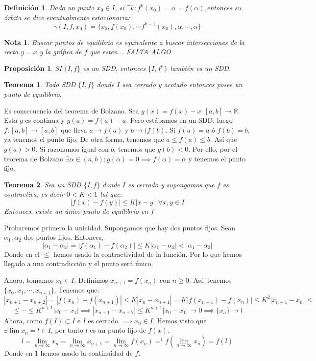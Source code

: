 \documentclass[11pt, a4paper, titlepage]{article}
\makeatletter
\renewenvironment{proof}[1][\proofname] {\vspace{-15pt}\par\pushQED{\qed}\normalfont\topsep6\p@\@plus6\p@\relax\trivlist\item[\hskip\labelsep\it#1\@addpunct{.}]\ignorespaces}{\popQED\endtrivlist\@endpefalse}
\newcommand{\R}{\mathbb{R}}
\theoremstyle{theorem-style}
\newtheorem*{nth}{Teorema}
\newtheorem*{nprop}{Proposición}
\theoremstyle{definition-style}
\newtheorem*{ndef}{Definición}
\theoremstyle{remark-style}
\newtheorem*{nota}{Nota}
\theoremstyle{example-style}
\makeatother
\begin{document}
\begin{ndef}
	Dado un punto $x_0 \in I$, si $\exists k: f^k(x_0) = \alpha = f(\alpha)$,entonces su órbita se dice eventualmente estacionaria:
	\[
	\gamma(I,f,x_0) = \{x_0, f(x_0), \cdots f^{k-1}(x_0), \alpha, \cdots, \alpha\}
	\]
\end{ndef}
\begin{nota}
	Buscar puntos de equilibrio es equivalente a buscar intersecciones de la recta $y=x$ y la gráfica de $f$ que esten... FALTA ALGO
	
	
\end{nota}
\begin{nprop}
	SI $\{I,f\}$ es un SDD, entonces $\{I,f^n\}$ también es un SDD.
\end{nprop}

\begin{nth}
	Todo SDD $\{I,f\}$ donde $I$ sea cerrado y acotado entonces posee un punto de equilibrio.
\end{nth}
\begin{proof}
	Es consecuencia del teorema de Bolzano. Sea $g(x) = f(x)-x :[a,b] \to \R$. Esta $g$ es continua y $g(a) = f(a)-a$. Pero estábamos en un SDD, luego $f:[a,b] \to [a,b]$ que lleva $a \to f(a) $ y $b \to(f(b)$. Si $f(a) = a $ ó $f(b) = b$, ya tenemos el punto fijo. De otra forma, tenemos que  $a \leq f(a) \leq b$.
	Así que $g(a) > 0$. Si razonamos igual con $b$, tenemos que $g(b) < 0$. 
	Por ello, por el teorema de Bolzano $\exists \alpha \in (a,b) : g(\alpha) = 0 \implies f(\alpha) = \alpha $ y tenemos el punto fijo.
	

\end{proof}
\begin{nth}
	Sea un SDD $\{I,f\}$ donde $I$ es cerrado y supongamos que $f$ es contractiva, es decir $0 < K < 1$ tal que:
	\[
	|f(x)-f(y)| \leq K |x-y| \ \ \forall x,y \in I
	\]
Entonces, existe un único punto de equilibrio en $f$
\end{nth}

\begin{proof}
	Probaremos primero la unicidad. Supongamos que hay dos puntos fijos. Sean $\alpha_1, \alpha_2$ dos puntos fijos. Entonces,
	 \[
	|\alpha_1 - \alpha_2| = |f(\alpha_1)- f(\alpha_2)| \leq K |\alpha_1 - \alpha_2| < |\alpha_1 - \alpha_2|
	\]
	Donde en el $\leq$ hemos usado la contractividad de la función. Por lo que hemos llegado a una contradicción y el punto será único.
	
	Ahora, tomamos $x_0\in I$. Definimos $x _{n+1} = f(x_n) $ con $n\geq 0$. Así, tenemos $\{x_0,x_1,\cdots , x _{n+1}\}$. Tenemos que:
	\[
	|x _{n+1} - x _{n+2}| = |f(x_n) - f(x _{n+1})| \leq K |x_n - x _{n+1}|= K |f(x _{n-1})- f(x_n)| \leq K^2|x _{n-1}-x_n| \leq 
	\]
	\[
	\leq \cdots \leq K^{n+1}|x_0 - x_1| \implies |x _{n+1}- x _{n+2}| \leq K^{n+1}|x_0-x_1| \to 0 \implies \{x_n\} \to l 
	\]
	Ahora, como $f(I)\subset I$ e $I$ es cerrado $\implies x_n \in I $. 
	Hemos visto que $\exists \lim x_n = l \in I$, por tanto $l$ es un punto fijo de $f(x)$.
	\[
	l =  \lim_{n\to \infty}x_n = \lim_{n\to \infty}x_{n+1} = \lim_{n\to \infty}f(x_n) =^1 f(\lim_{n\to \infty}x_n) = f(l)  
	\]
	Donde en 1 hemos usado la continuidad de $f$.
\end{proof}
\end{document}
